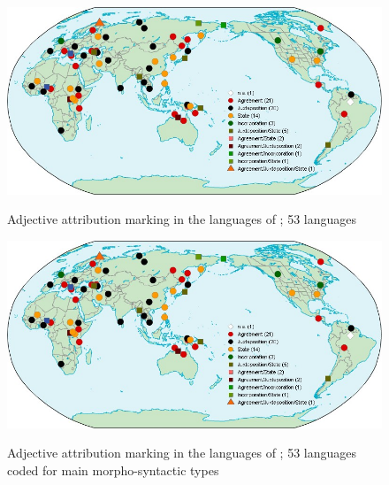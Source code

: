 \newpage
\begin{figure}
    
        \caption[Adjective attribution marking, North Asia]{Adjective attribution marking in the languages of ; 53 languages}

\includegraphics[width=\textwidth]{figures/WorldMapTyp.jpg}%
\label{NAMap}
\end{figure}

\newpage
\begin{figure}
    
        \caption[Adjective attribution marking, North Asia, main types]{Adjective attribution marking in the languages of ; 53 languages coded for main morpho-syntactic types}

\includegraphics[width=\textwidth]{figures/WorldMapTyp.jpg}%
\label{NAMapTyp}
\end{figure}


